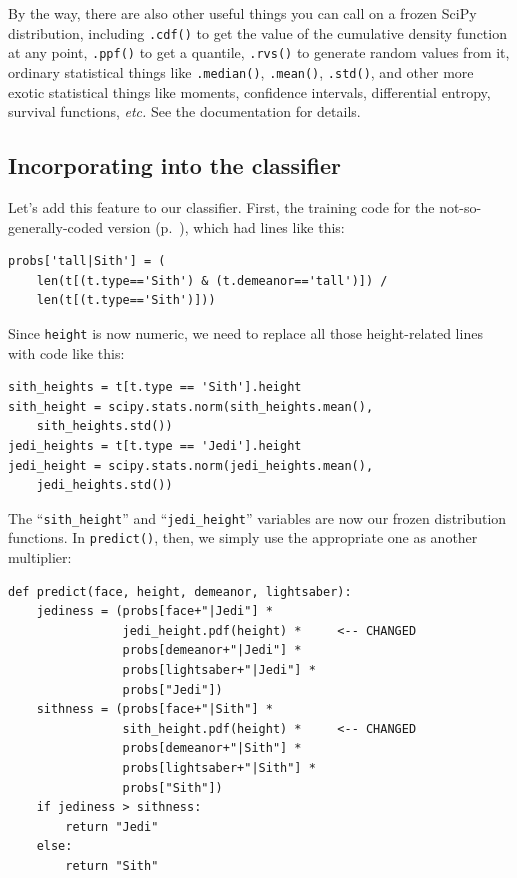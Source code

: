 
By the way, there are also other useful things you can call on a frozen SciPy
distribution, including \texttt{.cdf()} to get the value of the cumulative
density function at any point, \texttt{.ppf()} to get a quantile,
\texttt{.rvs()} to generate random values from it, ordinary statistical
things like \texttt{.median()}, \texttt{.mean()}, \texttt{.std()}, and other
more exotic statistical things like moments, confidence intervals, differential
entropy, survival functions, \textit{etc.} See the documentation for details.

\subsection{Incorporating into the classifier}

Let's add this feature to our classifier. First, the training code for the
not-so-generally-coded version (p.~\pageref{calcConditionals}), which had lines
like this:

\footnotesize
\begin{Verbatim}[fontsize=\small,samepage=true,frame=single,framesep=3mm]
probs['tall|Sith'] = (
    len(t[(t.type=='Sith') & (t.demeanor=='tall')]) /
    len(t[(t.type=='Sith')]))
\end{Verbatim}
\normalsize

Since \texttt{height} is now numeric, we need to replace all those
height-related lines with code like this:

\begin{Verbatim}[fontsize=\small,samepage=true,frame=single,framesep=3mm]
sith_heights = t[t.type == 'Sith'].height
sith_height = scipy.stats.norm(sith_heights.mean(),
    sith_heights.std())
jedi_heights = t[t.type == 'Jedi'].height
jedi_height = scipy.stats.norm(jedi_heights.mean(),
    jedi_heights.std())
\end{Verbatim}


The ``\texttt{sith\_height}'' and ``\texttt{jedi\_height}'' variables are now
our frozen distribution functions. In \texttt{predict()}, then, we simply use
the appropriate one as another multiplier:

\begin{Verbatim}[fontsize=\small,samepage=true,frame=single,framesep=3mm]
def predict(face, height, demeanor, lightsaber):
    jediness = (probs[face+"|Jedi"] *
                jedi_height.pdf(height) *     <-- CHANGED
                probs[demeanor+"|Jedi"] *
                probs[lightsaber+"|Jedi"] *
                probs["Jedi"])
    sithness = (probs[face+"|Sith"] *
                sith_height.pdf(height) *     <-- CHANGED
                probs[demeanor+"|Sith"] *
                probs[lightsaber+"|Sith"] *
                probs["Sith"])
    if jediness > sithness:
        return "Jedi"
    else:
        return "Sith"
\end{Verbatim}

